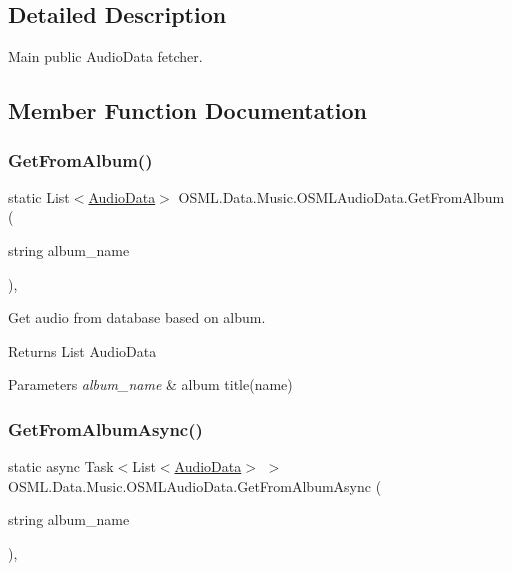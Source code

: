 \subsection{Detailed Description}
Main public Audio\+Data fetcher. 



\subsection{Member Function Documentation}
\mbox{\label{classOSML_1_1Data_1_1Music_1_1OSMLAudioData_a61354400c9e04ef939b1c8731472efe8}} 
\subsubsection{\texorpdfstring{GetFromAlbum()}{GetFromAlbum()}}
{\footnotesize\ttfamily static List$<$\mbox{\hyperlink{classOSML_1_1Media_1_1AudioData}{Audio\+Data}}$>$ O\+S\+M\+L.\+Data.\+Music.\+O\+S\+M\+L\+Audio\+Data.\+Get\+From\+Album (\begin{DoxyParamCaption}\item[{string}]{album\+\_\+name }\end{DoxyParamCaption})\hspace{0.3cm}{\ttfamily [inline]}, {\ttfamily [static]}}



Get audio from database based on album. 

\begin{DoxyReturn}{Returns}
List Audio\+Data 
\end{DoxyReturn}

\begin{DoxyParams}{Parameters}
{\em album\+\_\+name} & album title(name)\\
\hline
\end{DoxyParams}
\mbox{\label{classOSML_1_1Data_1_1Music_1_1OSMLAudioData_a4b7fcb38d92a4bc30a3175b706ed12f6}} 
\subsubsection{\texorpdfstring{GetFromAlbumAsync()}{GetFromAlbumAsync()}}
{\footnotesize\ttfamily static async Task$<$List$<$\mbox{\hyperlink{classOSML_1_1Media_1_1AudioData}{Audio\+Data}}$>$ $>$ O\+S\+M\+L.\+Data.\+Music.\+O\+S\+M\+L\+Audio\+Data.\+Get\+From\+Album\+Async (\begin{DoxyParamCaption}\item[{string}]{album\+\_\+name }\end{DoxyParamCaption})\hspace{0.3cm}{\ttfamily [inline]}, {\ttfamily [static]}}



